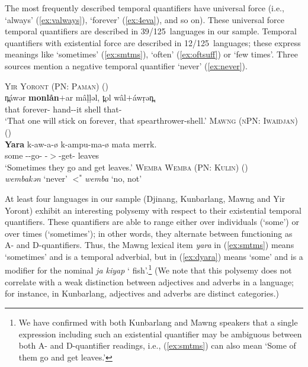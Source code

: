 \documentclass[12pt,egregdoesnotlikesansseriftitles]{scrartcl}
\newcommand{\ofy}{/125} %
\begin{document}
The most frequently described temporal quantifiers have universal force (i.e., `always' (\ref{ex:valways}), `forever' (\ref{ex:4eva}), and so on). These universal force temporal quantifiers are described in 39\ofy \ languages in our sample.%
Temporal quantifiers with existential force are described in 12\ofy \  languages; these express meanings like `sometimes' (\ref{ex:smtms}), `often' (\ref{ex:oftsuff}) or `few times'. Three sources mention a negative temporal quantifier `never' (\ref{ex:never}).
\begin{exe}
  \ex\label{ex:4eva} \textsc{Yir Yoront (PN: Paman)} \hfill (\citealt[343]{alpher73})\\
  \gll n̪\'awər \textbf{monlån}$+$ar m\^a\d{l}\d{l}əl, t̪ol w\^al$+$\'aw\d{r}ən̪.\\
  that forever-\Sel{} hand-\Np-it shell that-\Sub\\
  \glt `That one will stick on forever, that spearthrower-shell.'
  \ex\label{ex:smtms} \textsc{Mawng (nPN: Iwaidjan)} \hfill (\citealt{ngaralk})\\
  \gll \textbf{Yara} k-aw-a-ø k-ampu-ma-ø mata merrk.\\
  some \Prs-\Tpl-go-\Np{} \Prs-\Tpl$>$\Third\Clveg-get-\Np{} \Clveg{} leaves\\
  \glt `Sometimes they go and get leaves.' %
  \ex\label{ex:never} \textsc{Wemba Wemba (PN: Kulin)} \hfill (\citealt[47]{hercus92})\\
  \textit{\charis wembakən} `never' $<^*$\textit{wemba} `no, not'
\end{exe}

At least four languages in our sample (Djinang, Kunbarlang, Mawng and Yir Yoront) exhibit an interesting polysemy with respect to their existential temporal quantifiers. These quantifiers are able to range either over individuals (`some') or over times (`sometimes'); in other words, they alternate between functioning as A- and D-quantifiers.  Thus, the Mawng lexical item \textit{yara} in (\ref{ex:smtms}) means `sometimes' and is a temporal adverbial, but in (\ref{ex:dyara}) means `some' and is a modifier for the nominal \textit{ja kiyap} `\Clm{} fish'.\footnote{We have confirmed with both Kunbarlang and Mawng speakers that a single expression including such an existential quantifier may be ambiguous between both A- and D-quantifier readings, i.e., (\ref{ex:smtms}) can also mean `Some of them go and get leaves.'} (We note that this polysemy does not correlate with a weak distinction between adjectives and adverbs in a language; for instance, in Kunbarlang, adjectives and adverbs are distinct categories.)
\end{document}

